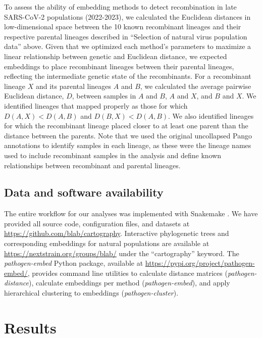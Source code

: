\documentclass[10pt,letterpaper]{article}
\begin{document}
To assess the ability of embedding methods to detect recombination in late SARS-CoV-2 populations (2022-2023), we calculated the Euclidean distances in low-dimensional space between the 10 known recombinant lineages and their respective parental lineages described in ``Selection of natural virus population data'' above.
Given that we optimized each method's parameters to maximize a linear relationship between genetic and Euclidean distance, we expected embeddings to place recombinant lineages between their parental lineages, reflecting the intermediate genetic state of the recombinants.
For a recombinant lineage $X$ and its parental lineages $A$ and $B$, we calculated the average pairwise Euclidean distance, $D$, between samples in $A$ and $B$, $A$ and $X$, and $B$ and $X$.
We identified lineages that mapped properly as those for which $D(A, X) < D(A, B)$ and $D(B, X) < D(A, B)$.
We also identified lineages for which the recombinant lineage placed closer to at least one parent than the distance between the parents.
Note that we used the original uncollapsed Pango annotations to identify samples in each lineage, as these were the lineage names used to include recombinant samples in the analysis and define known relationships between recombinant and parental lineages.

\subsection*{Data and software availability}

The entire workflow for our analyses was implemented with Snakemake \cite{molder_2021}.
We have provided all source code, configuration files, and datasets at \href{https://github.com/blab/cartography}{https://github.com/blab/cartography}.
Interactive phylogenetic trees and corresponding embeddings for natural populations are available at \href{https://nextstrain.org/groups/blab/}{https://nextstrain.org/groups/blab/} under the ``cartography'' keyword.
The \textit{pathogen-embed} Python package, available at \href{https://pypi.org/project/pathogen-embed/}{https://pypi.org/project/pathogen-embed/}, provides command line utilities to calculate distance matrices (\textit{pathogen-distance}), calculate embeddings per method (\textit{pathogen-embed}), and apply hierarchical clustering to embeddings (\textit{pathogen-cluster}).

\section*{Results}
\end{document}
